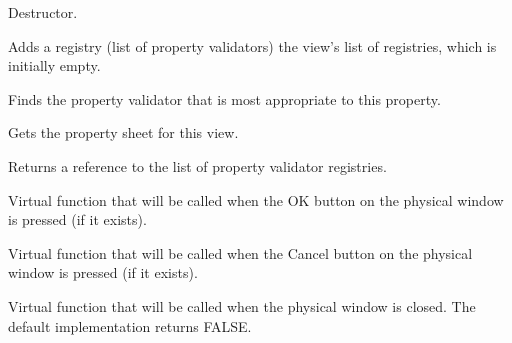

Destructor.

\label{wxpropertyviewaddregistry}


Adds a registry (list of property validators) the view's list of registries, which is initially empty.

\label{wxpropertyviewfindpropertyvalidator}


Finds the property validator that is most appropriate to this property.

\label{wxpropertyviewgetpropertysheet}


Gets the property sheet for this view.

\label{wxpropertyviewgetregistrylist}


Returns a reference to the list of property validator registries.

\label{wxpropertyviewonok}


Virtual function that will be called when the OK button on the physical window is pressed (if it exists).

\label{wxpropertyviewoncancel}


Virtual function that will be called when the Cancel button on the physical window is pressed (if it exists).

\label{wxpropertyviewonclose}


Virtual function that will be called when the physical window is closed. The default implementation returns FALSE.

\label{wxpropertyviewonhelp}

